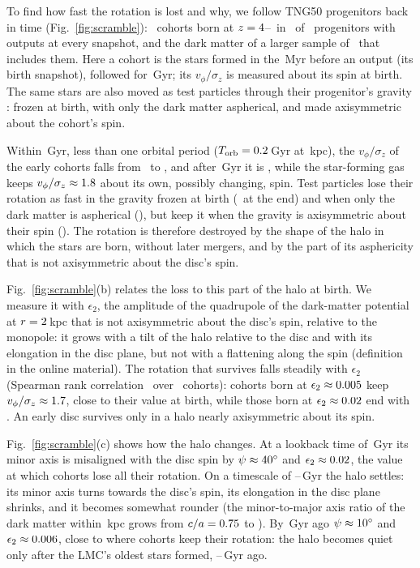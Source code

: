 \documentclass[fleqn,usenatbib,letters]{mnras}
\begin{document}
To find how fast the rotation is lost and why, we follow TNG50
progenitors back in time (Fig.~\ref{fig:scramble}): \ltNCohorts\ cohorts born
at $z=4$--\ltZSnapB\ in \ltNCohortGal\ of \ltNFull\ progenitors
with outputs at every snapshot, and the dark matter of a larger sample
of \ltNSample\ that includes them. Here a cohort is the stars formed in the
\ltWindow\,Myr before an output (its birth snapshot), followed for
\ltDtMax\,Gyr; its $v_\phi/\sigma_z$ is measured about its spin at
birth. The same stars are also moved as test particles through their
progenitor's gravity \citep[computed with AGAMA;][]{Vasiliev2019}:
frozen at birth, with only the dark matter aspherical, and made
axisymmetric about the cohort's spin.

Within \ltScrTSecond\,Gyr, less than one orbital period
($T_{\rm orb}=0.2$\,Gyr at \ltROrb\,kpc), the $v_\phi/\sigma_z$ of
the early cohorts falls from \ltScrStart\ to \ltScrSecond, and after
\ltScrTEnd\,Gyr it is \ltScrEnd, while the star-forming gas keeps
$v_\phi/\sigma_z\approx1.8$ about its own, possibly changing,
spin. Test particles lose their rotation as fast in the gravity frozen
at birth (\ltFrozenEnd\ at the end) and when only the dark matter is
aspherical (\ltDmEnd), but keep it when the gravity is axisymmetric
about their spin (\ltAxiEnd). The rotation is therefore destroyed by the
shape of the halo in which the stars are born, without later mergers,
and by the part of its asphericity that is not axisymmetric about the
disc's spin.

Fig.~\ref{fig:scramble}(b) relates the loss to this part of the halo
at birth. We measure it with $\epsilon_2$, the amplitude of the
quadrupole of the dark-matter potential at $r=2$\,kpc that is
not axisymmetric about the disc's spin, relative to the monopole: it
grows with a tilt of the halo relative to the disc and with its
elongation in the disc plane, but not with a flattening along the
spin (definition in the online material). The rotation that survives
falls steadily with $\epsilon_2$ (Spearman rank correlation
\ltEpsSpearman\ over \ltNCohortsB\ cohorts): cohorts born at
$\epsilon_2\approx0.005$ keep $v_\phi/\sigma_z\approx1.7$,
close to their value at birth, while those born at
$\epsilon_2\approx0.02$ end with \ltVsEpsHigh. An early disc
survives only in a halo nearly axisymmetric about its spin.

Fig.~\ref{fig:scramble}(c) shows how the halo changes. At a lookback
time of \ltLbEarly\,Gyr its minor axis is misaligned with the disc
spin by $\psi\approx40^\circ$ and $\epsilon_2\approx0.02$,
the value at which cohorts lose all their rotation. On a timescale of \ltSettleLo--\ltSettleHi\,Gyr the halo
settles: its minor axis turns towards the disc's spin, its elongation
in the disc plane shrinks, and it becomes somewhat rounder (the
minor-to-major axis ratio of the dark matter within \ltSetRIn\,kpc
grows from $c/a=0.75$ to \ltCaLate). By \ltLbLate\,Gyr ago
$\psi\approx10^\circ$ and $\epsilon_2\approx0.006$, close to
where cohorts keep their rotation: the halo becomes quiet only after
the LMC's oldest stars formed, \ltOldAgeLo--\ltOldAgeHi\,Gyr ago.
\end{document}
